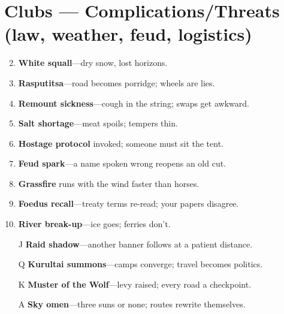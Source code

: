 \section*{\textbf{Clubs} --- Complications/Threats (law, weather, feud, logistics)}
\begin{enumerate}
\setcounter{enumi}{1}
\item \textbf{White squall}---dry snow, lost horizons.
\item \textbf{Rasputitsa}---road becomes porridge; wheels are lies.
\item \textbf{Remount sickness}---cough in the string; swaps get awkward.
\item \textbf{Salt shortage}---meat spoils; tempers thin.
\item \textbf{Hostage protocol} invoked; someone must sit the tent.
\item \textbf{Feud spark}---a name spoken wrong reopens an old cut.
\item \textbf{Grassfire} runs with the wind faster than horses.
\item \textbf{Foedus recall}---treaty terms re-read; your papers disagree.
\item \textbf{River break-up}---ice goes; ferries don't.
\item[J] \textbf{Raid shadow}---another banner follows at a patient distance.
\item[Q] \textbf{Kurultai summons}---camps converge; travel becomes politics.
\item[K] \textbf{Muster of the Wolf}---levy raised; every road a checkpoint.
\item[A] \textbf{Sky omen}---three suns or none; routes rewrite themselves.
\end{enumerate}

